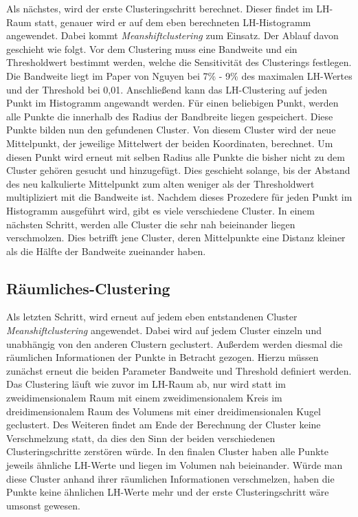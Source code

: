 Als nächstes, wird der erste Clusteringschritt berechnet. Dieser findet im LH-Raum statt, genauer wird er auf dem eben berechneten LH-Histogramm angewendet. Dabei kommt \textit{Meanshiftclustering} zum Einsatz. Der Ablauf davon geschieht wie folgt.
Vor dem Clustering muss eine Bandweite und ein Thresholdwert bestimmt werden, welche die Sensitivität des Clusterings festlegen. Die Bandweite liegt im Paper von Nguyen \cite{nguyen2012clustering} bei 7\% - 9\% des maximalen LH-Wertes und der Threshold bei 0,01. Anschließend kann das LH-Clustering auf jeden Punkt im Histogramm angewandt werden.
\newline
Für einen beliebigen Punkt, werden alle Punkte die innerhalb des Radius der Bandbreite liegen gespeichert. Diese Punkte bilden nun den gefundenen Cluster. Von diesem Cluster wird der neue Mittelpunkt, der jeweilige Mittelwert der beiden Koordinaten, berechnet. Um diesen Punkt wird erneut mit selben Radius alle Punkte die bisher nicht zu dem Cluster gehören gesucht und hinzugefügt. Dies geschieht solange, bis der Abstand des neu kalkulierte Mittelpunkt zum alten weniger als der Thresholdwert multipliziert mit die Bandweite ist. 
Nachdem dieses Prozedere für jeden Punkt im Histogramm ausgeführt wird, gibt es viele verschiedene Cluster. In einem nächsten Schritt, werden alle Cluster die sehr nah beieinander liegen verschmolzen. Dies betrifft jene Cluster, deren Mittelpunkte eine Distanz kleiner als die Hälfte der Bandweite zueinander haben.

\subsection{Räumliches-Clustering}

Als letzten Schritt, wird erneut auf jedem eben entstandenen Cluster \textit{Meanshiftclustering} angewendet. Dabei wird auf jedem Cluster einzeln und unabhängig von den anderen Clustern geclustert. Außerdem werden diesmal die räumlichen Informationen der Punkte in Betracht gezogen. Hierzu müssen zunächst erneut die beiden Parameter Bandweite und Threshold definiert werden. Das Clustering läuft wie zuvor im LH-Raum ab, nur wird statt im zweidimensionalem Raum mit einem zweidimensionalem Kreis im dreidimensionalem Raum des Volumens mit einer dreidimensionalen Kugel geclustert. Des Weiteren findet am Ende der Berechnung der Cluster keine Verschmelzung statt, da dies den Sinn der beiden verschiedenen Clusteringschritte zerstören würde. In den finalen Cluster haben alle Punkte jeweils ähnliche LH-Werte und liegen im Volumen nah beieinander. Würde man diese Cluster anhand ihrer räumlichen Informationen verschmelzen, haben die Punkte keine ähnlichen LH-Werte mehr und der erste Clusteringschritt wäre umsonst gewesen.







